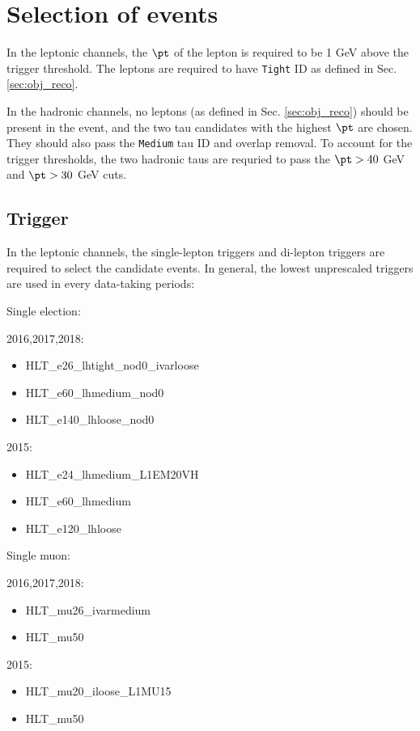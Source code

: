 \section{Selection of events}
\label{sec:selection}

In the leptonic channels, the $\pt$ of the lepton is required to be 1 GeV above the trigger threshold. The leptons are required to have \texttt{Tight} ID as defined in Sec. \ref{sec:obj_reco}. %

In the hadronic channels, no leptons (as defined in Sec. \ref{sec:obj_reco}) should be present in the event, and the two tau candidates with the highest $\pt$ are chosen. They should also pass the \texttt{Medium} tau ID and overlap removal. To account for the trigger thresholds, the two hadronic taus are requried to pass the $\pt>40$ GeV and $\pt>30$ GeV cuts.

\subsection{Trigger}
\label{sec:trigger}

In the leptonic channels, the single-lepton triggers and di-lepton triggers are required to select the candidate events. In general, the lowest unprescaled triggers are used in every data-taking periods:

Single election:

2016,2017,2018:
\begin{itemize}
	\item HLT\_e26\_lhtight\_nod0\_ivarloose
	\item HLT\_e60\_lhmedium\_nod0
	\item HLT\_e140\_lhloose\_nod0
\end{itemize}
2015:
\begin{itemize}
	\item HLT\_e24\_lhmedium\_L1EM20VH
	\item HLT\_e60\_lhmedium
	\item HLT\_e120\_lhloose
\end{itemize}

Single muon:

2016,2017,2018:
\begin{itemize}
	\item HLT\_mu26\_ivarmedium
	\item HLT\_mu50
\end{itemize}
2015:
\begin{itemize}
	\item HLT\_mu20\_iloose\_L1MU15
	\item HLT\_mu50
\end{itemize}

